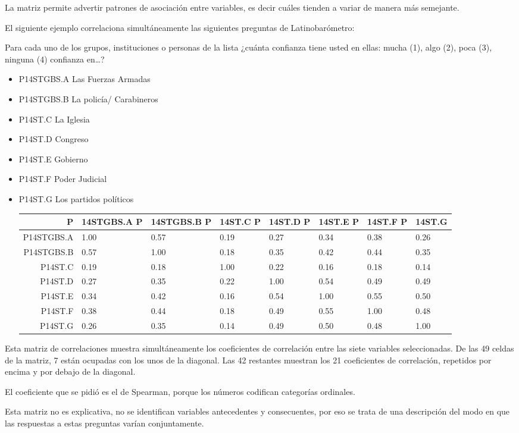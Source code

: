 \documentclass[]{book}
\begin{document}
La matriz permite advertir patrones de asociación entre variables, es decir cuáles tienden a variar de manera más semejante.

El siguiente ejemplo correlaciona simultáneamente las siguientes preguntas de Latinobarómetro:

Para cada uno de los grupos, instituciones o personas de la lista ¿cuánta confianza tiene usted en ellas: mucha (1), algo (2), poca (3), ninguna (4) confianza en\ldots{}?

\begin{itemize}
\item
  P14STGBS.A Las Fuerzas Armadas
\item
  P14STGBS.B La policía/ Carabineros
\item
  P14ST.C La Iglesia
\item
  P14ST.D Congreso
\item
  P14ST.E Gobierno
\item
  P14ST.F Poder Judicial
\item
  P14ST.G Los partidos políticos

  \begin{longtable}[]{@{}rlllllll@{}}
  \toprule
  P & 14STGBS.A P & 14STGBS.B P & 14ST.C P & 14ST.D P & 14ST.E P & 14ST.F P & 14ST.G\tabularnewline
  \midrule
  \endhead
  P14STGBS.A & 1.00 & 0.57 & 0.19 & 0.27 & 0.34 & 0.38 & 0.26\tabularnewline
  P14STGBS.B & 0.57 & 1.00 & 0.18 & 0.35 & 0.42 & 0.44 & 0.35\tabularnewline
  P14ST.C & 0.19 & 0.18 & 1.00 & 0.22 & 0.16 & 0.18 & 0.14\tabularnewline
  P14ST.D & 0.27 & 0.35 & 0.22 & 1.00 & 0.54 & 0.49 & 0.49\tabularnewline
  P14ST.E & 0.34 & 0.42 & 0.16 & 0.54 & 1.00 & 0.55 & 0.50\tabularnewline
  P14ST.F & 0.38 & 0.44 & 0.18 & 0.49 & 0.55 & 1.00 & 0.48\tabularnewline
  P14ST.G & 0.26 & 0.35 & 0.14 & 0.49 & 0.50 & 0.48 & 1.00\tabularnewline
  \bottomrule
  \end{longtable}
\end{itemize}

Esta matriz de correlaciones muestra simultáneamente los coeficientes de correlación entre las siete variables seleccionadas. De las 49 celdas de la matriz, 7 están ocupadas con los unos de la diagonal. Las 42 restantes muestran los 21 coeficientes de correlación, repetidos por encima y por debajo de la diagonal.

El coeficiente que se pidió es el de Spearman, porque los números codifican categorías ordinales.

Esta matriz no es explicativa, no se identifican variables antecedentes y consecuentes, por eso se trata de una descripción del modo en que las respuestas a estas preguntas varían conjuntamente.
\end{document}
